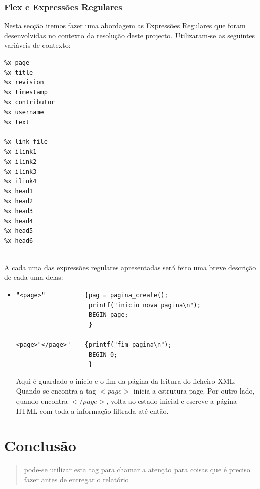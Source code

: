 \documentclass[11pt, a4paper, oneside]{article}
\newcommand{\todo}[1] {\textcolor{BrickRed}{\begin{quote}#1\end{quote}}}
\begin{document}
\subsubsection{Flex e Expressões Regulares}

Nesta secção iremos fazer uma abordagem as Expressões Regulares que foram desenvolvidas no contexto da resolução deste projecto. Utilizaram-se as seguintes variáveis de contexto:

\begin{verbatim}
%x page
%x title
%x revision
%x timestamp
%x contributor
%x username
%x text

%x link_file
%x ilink1
%x ilink2
%x ilink3
%x ilink4
%x head1
%x head2
%x head3
%x head4
%x head5
%x head6


\end{verbatim}

A cada uma das expressões regulares apresentadas será feito uma breve descrição de cada uma delas:
\begin{itemize}
\item 
\begin{verbatim}
"<page>"           {pag = pagina_create();
                    printf("inicio nova pagina\n");
                    BEGIN page;
                    }

<page>"</page>"    {printf("fim pagina\n");
                    BEGIN 0;
                    }
\end{verbatim}

Aqui é guardado o início e o fim da página da leitura do ficheiro XML. Quando se encontra a tag \begin{math}<page>\end{math} inicia a estrutura page. Por outro lado, quando encontra \begin{math}</page>\end{math}, volta ao estado inicial e escreve a página HTML com toda a informação filtrada até então.



\end{itemize}


\newpage
\section{Conclusão}

\newpage

\todo{pode-se utilizar esta tag para chamar a atenção para coisas que é preciso fazer antes de entregar o relatório}
\end{document}
